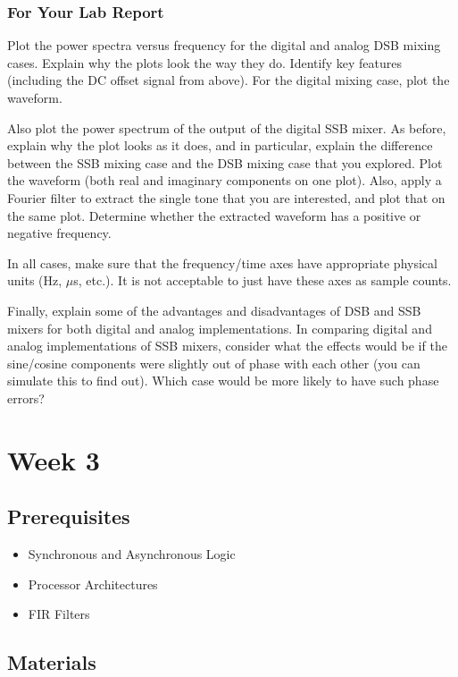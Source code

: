 \documentclass[11pt]{article}
\begin{document}
\subsubsection{For Your Lab Report}

        Plot the power spectra versus
frequency for the digital and analog DSB mixing cases. Explain why the plots look the way they do.  Identify
key features (including the DC offset signal from above).  For the digital mixing case, plot the waveform.

Also plot the power spectrum of the output of the digital SSB mixer.  As before, explain why the plot
looks as it does, and in particular, explain the difference between the SSB mixing case and the DSB mixing
case that you explored.  Plot the waveform (both real and imaginary components on one plot). Also, apply a
Fourier filter to extract the single tone that you are interested, and plot that on the same plot.
Determine
whether the extracted waveform has a positive or negative frequency.

In all cases, make sure that the frequency/time axes have appropriate physical units (Hz, $\mu$s, etc.).
It is not acceptable to just have these axes as sample counts.

Finally, explain some of the advantages and disadvantages of DSB and SSB mixers for both digital and
analog implementations.  In comparing digital and analog implementations of SSB mixers, consider what the effects would
be if the sine/cosine components were slightly out of phase with each other (you can simulate this to find out).  Which
case would be more likely to have such phase errors?

\section{Week 3}
\subsection*{Prerequisites}

\begin{itemize}[noitemsep,nolistsep]
\item Synchronous and Asynchronous Logic
\item Processor Architectures
\item FIR Filters
\end{itemize}

\subsection*{Materials}
\end{document}
